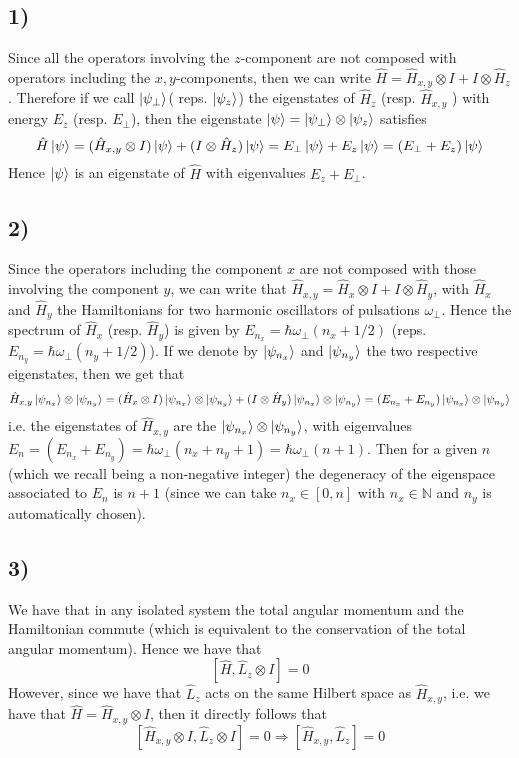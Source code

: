 \documentclass[10pt,a4paper]{book}
\begin{document}
\subsection*{1)}

Since all the operators involving the $z$-component are not composed with operators including the $x,y$-components, then we can write $\hat{H}=\hat{H}_{x,y}\otimes I+I\otimes\hat{H}_z$. Therefore if we call $\ket{\psi_{\perp}}$( reps. $\ket{\psi_z}$) the eigenstates of $\hat{H}_z$ (resp. $\hat{H}_{x,y}$ ) with energy $E_z$ (resp. $E_{\perp}$), then the eigenstate $\ket{\psi}=\ket{\psi_{\perp}}\otimes\ket{\psi_z}$ satisfies
$$\hat{H}\ket{\psi}=(\hat{H}_{x,y}\otimes I)\ket{\psi}+(I\otimes\hat{H}_z)\ket{\psi}=E_{\perp}\ket{\psi}+E_z\ket{\psi}=(E_{\perp}+E_{z})\ket{\psi}$$
Hence $\ket{\psi}$ is an eigenstate of $\hat{H}$ with eigenvalues $E_z+E_{\perp}$. 

\subsection*{2)}
Since the operators including the component $x$ are not composed with those involving the component $y$, we can write that $\hat{H}_{x,y}=\hat{H}_x\otimes I+I\otimes\hat{H}_y$, with $\hat{H}_x$ and $\hat{H}_y$ the Hamiltonians for two harmonic oscillators of pulsations $\omega_{\perp}$. Hence the spectrum of $\hat{H}_x$ (resp. $\hat{H}_y$) is given by $E_{n_x}=\hbar \omega_{\perp}(n_x+1/2)$ (reps. $E_{n_y}=\hbar\omega_{\perp}(n_y+1/2)$). If we denote by $\ket{\psi_{n_x}}$ and $\ket{\psi_{n_y}}$ the two respective eigenstates, then we get that
$$\hat{H}_{x,y}\ket{\psi_{n_x}}\otimes\ket{\psi_{n_y}}=(\hat{H}_x\otimes I)\ket{\psi_{n_x}}\otimes\ket{\psi_{n_y}}+(I\otimes\hat{H}_y)\ket{\psi_{n_x}}\otimes\ket{\psi_{n_y}}=(E_{n_x}+E_{n_y})\ket{\psi_{n_x}}\otimes\ket{\psi_{n_y}}$$
i.e. the eigenstates of $\hat{H}_{x,y}$ are the $\ket{\psi_{n_x}}\otimes\ket{\psi_{n_y}}$, with eigenvalues $E_n=(E_{n_x}+E_{n_y})=\hbar\omega_{\perp}(n_x+n_y+1)=\hbar\omega_{\perp}(n+1)$. Then for a given $n$ (which we recall being a non-negative integer) the degeneracy of the eigenspace associated to $E_n$ is $n+1$ (since we can take $n_x\in [0,n]$ with $n_x\in\mathbb{N}$ and $n_y$ is automatically chosen).

\subsection*{3)}

We have that in any isolated system the total angular momentum and the Hamiltonian commute (which is equivalent to the conservation of the total angular momentum). Hence we have that $$[\hat{H},\hat{L}_z\otimes I]=0$$
However, since we have that $\hat{L}_z$ acts on the same Hilbert space as $\hat{H}_{x,y}$, i.e. we have that $\hat{H}=\hat{H}_{x,y}\otimes I$, then it directly follows that 
$$[\hat{H}_{x,y}\otimes I,\hat{L}_z\otimes I]=0\Rightarrow [\hat{H}_{x,y},\hat{L}_z]=0$$
\end{document}
